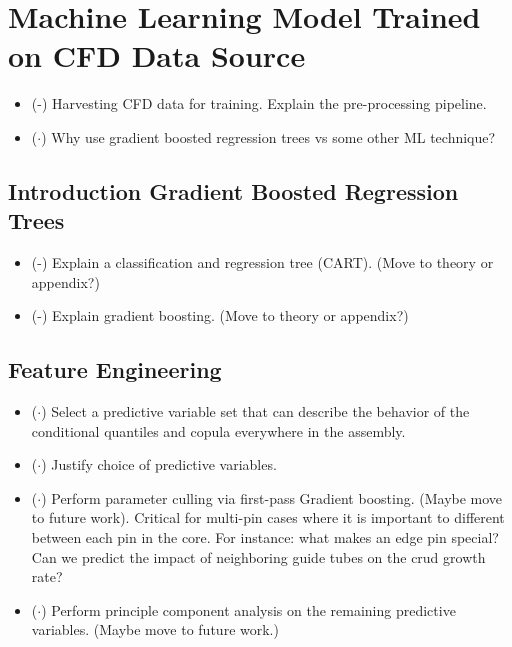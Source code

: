 
\section{Machine Learning Model Trained on CFD Data Source}

\begin{itemize}
    \item (\checkmark-) Harvesting CFD data for training. Explain the pre-processing pipeline.
    \item ($\cdot$) Why use gradient boosted regression trees vs some other ML technique?
\end{itemize}

\subsection{Introduction Gradient Boosted Regression Trees}
\begin{itemize}
    \item (\checkmark-) Explain a classification and regression tree (CART).  (Move to theory or appendix?)
    \item (\checkmark-) Explain gradient boosting.  (Move to theory or appendix?)
\end{itemize}

\subsection{Feature Engineering}
\begin{itemize}
    \item ($\cdot$) Select a predictive variable set that can describe the behavior of the conditional quantiles and copula everywhere in the assembly.
    \item ($\cdot$) Justify choice of predictive variables.
    \item ($\cdot$) Perform parameter culling via first-pass Gradient boosting. (Maybe move to future work). Critical for multi-pin cases where it is
        important to different between each pin in the core.  For instance: what makes an edge pin special?  Can we predict the impact of neighboring
        guide tubes on the crud growth rate?
    \item ($\cdot$) Perform principle component analysis on the remaining predictive variables. (Maybe move to future work.)

\end{itemize}

